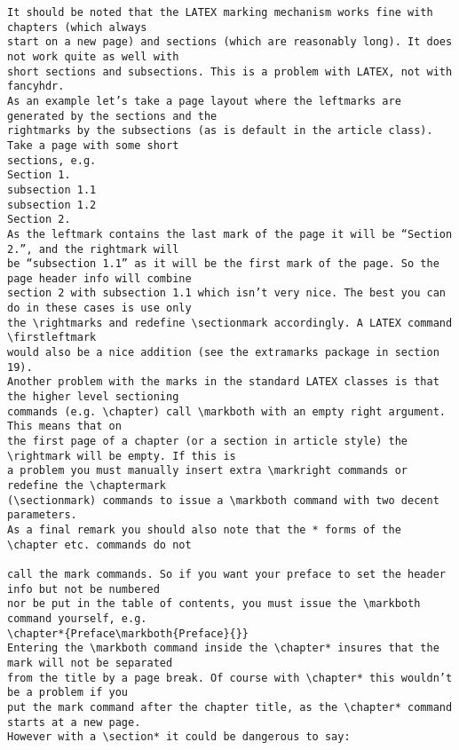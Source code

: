 \begin{verbatim}
It should be noted that the LATEX marking mechanism works fine with chapters (which always
start on a new page) and sections (which are reasonably long). It does not work quite as well with
short sections and subsections. This is a problem with LATEX, not with fancyhdr.
As an example let’s take a page layout where the leftmarks are generated by the sections and the
rightmarks by the subsections (as is default in the article class). Take a page with some short
sections, e.g.
Section 1.
subsection 1.1
subsection 1.2
Section 2.
As the leftmark contains the last mark of the page it will be “Section 2.”, and the rightmark will
be “subsection 1.1” as it will be the first mark of the page. So the page header info will combine
section 2 with subsection 1.1 which isn’t very nice. The best you can do in these cases is use only
the \rightmarks and redefine \sectionmark accordingly. A LATEX command \firstleftmark
would also be a nice addition (see the extramarks package in section 19).
Another problem with the marks in the standard LATEX classes is that the higher level sectioning
commands (e.g. \chapter) call \markboth with an empty right argument. This means that on
the first page of a chapter (or a section in article style) the \rightmark will be empty. If this is
a problem you must manually insert extra \markright commands or redefine the \chaptermark
(\sectionmark) commands to issue a \markboth command with two decent parameters.
As a final remark you should also note that the * forms of the \chapter etc. commands do not

call the mark commands. So if you want your preface to set the header info but not be numbered
nor be put in the table of contents, you must issue the \markboth command yourself, e.g.
\chapter*{Preface\markboth{Preface}{}}
Entering the \markboth command inside the \chapter* insures that the mark will not be separated
from the title by a page break. Of course with \chapter* this wouldn’t be a problem if you
put the mark command after the chapter title, as the \chapter* command starts at a new page.
However with a \section* it could be dangerous to say:

\end{verbatim}
